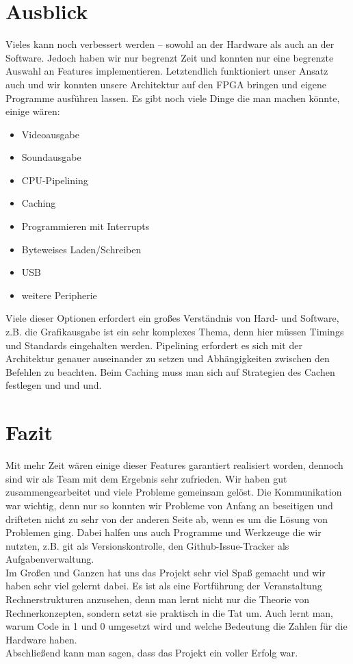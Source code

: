 \section{Ausblick}
Vieles kann noch verbessert werden -- sowohl an der Hardware als auch an der Software. Jedoch haben wir nur begrenzt Zeit und konnten nur eine begrenzte Auswahl an Features implementieren. Letztendlich funktioniert unser Ansatz auch und wir konnten unsere Architektur auf den FPGA bringen und eigene Programme ausführen lassen. Es gibt noch viele Dinge die man machen könnte, einige wären:
\begin{itemize}
  \item Videoausgabe
  \item Soundausgabe
  \item CPU-Pipelining
  \item Caching
  \item Programmieren mit Interrupts
  \item Byteweises Laden/Schreiben
  \item USB
  \item weitere Peripherie
\end{itemize}
Viele dieser Optionen erfordert ein großes Verständnis von Hard- und Software, z.B. die Grafikausgabe ist ein sehr komplexes Thema, denn hier müssen Timings und Standards eingehalten werden. Pipelining erfordert es sich mit der Architektur genauer auseinander zu setzen und Abhängigkeiten zwischen den Befehlen zu beachten. Beim Caching muss man sich auf Strategien des Cachen festlegen und und und.\\

\section{Fazit}
Mit mehr Zeit wären einige dieser Features garantiert realisiert worden, dennoch sind wir als Team mit dem Ergebnis sehr zufrieden. Wir haben gut zusammengearbeitet und viele Probleme gemeinsam gelöst. Die Kommunikation war wichtig, denn nur so konnten wir Probleme von Anfang an beseitigen und drifteten nicht zu sehr von der anderen Seite ab, wenn es um die Lösung von Problemen ging. Dabei halfen uns auch Programme und Werkzeuge die wir nutzten, z.B. git als Versionskontrolle, den Github-Issue-Tracker als Aufgabenverwaltung.\\
Im Großen und Ganzen hat uns das Projekt sehr viel Spaß gemacht und wir haben sehr viel gelernt dabei. Es ist als eine Fortführung der Veranstaltung Rechnerstrukturen anzusehen, denn man lernt nicht nur die Theorie von Rechnerkonzepten, sondern setzt sie praktisch in die Tat um. Auch lernt man, warum Code in 1 und 0 umgesetzt wird und welche Bedeutung die Zahlen für die Hardware haben.\\
Abschließend kann man sagen, dass das Projekt ein voller Erfolg war.
